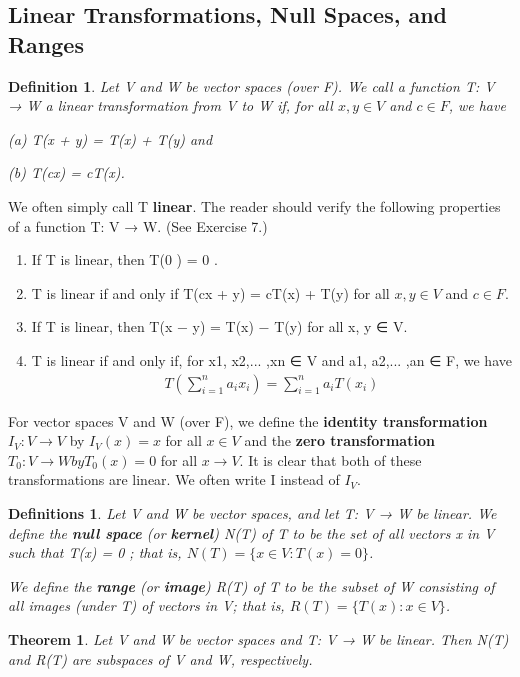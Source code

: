 \documentclass{article}
\newcommand{\bd}[1]{\textbf{#1}}
\theoremstyle{plain}
\newtheorem{theorem}{Theorem}[section]
\newtheorem*{definition1}{Definition}
\newtheorem*{definitions}{Definitions}
\theoremstyle{plain} %
\begin{document}
\subsection{Linear Transformations, Null Spaces, and Ranges}

\begin{definition1}
Let V and W be vector spaces (over F). We call a function T: V → W a linear transformation from V to W if, for all $x, y \in V$ and $c \in F$, we have

(a) T(x + y) = T(x) + T(y) and

(b) T(cx) = cT(x).
\end{definition1}

We often simply call T \bd{linear}. The reader should verify the following
properties of a function T: V → W. (See Exercise 7.)
\begin{enumerate}
\item If T is linear, then T(0 ) = 0 .
\item T is linear if and only if T(cx + y) = cT(x) + T(y) for all $x, y \in V$ and
$c \in F$.
\item If T is linear, then T(x − y) = T(x) − T(y) for all x, y ∈ V.
\item T is linear if and only if, for x1, x2,... ,xn ∈ V and a1, a2,... ,an ∈ F, we have 
\begin{align*}
T\left(\sum_{i=1}^n a_ix_i\right)=\sum_{i=1}^n a_iT(x_i)
\end{align*}
\end{enumerate}

For vector spaces V and W (over F), we define the \bd{identity transformation} $I_V : V \to V$ by $I_V(x) = x$ for all $x \in V$ and the \bd{zero transformation} $T_0 : V \to W by T_0(x) = 0$ for all $x \to V$. It is clear that both of these transformations are linear. We often write I instead of $I_V$.

\begin{definitions}
Let V and W be vector spaces, and let T: V → W be linear.
We define the \bd{null space} (or \bd{kernel}) N(T) of T to be the set of all vectors x in V such that T(x) = 0 ; that is, $N(T) = \{x \in V: T(x) = 0 \}$.

We define the \bd{range} (or \bd{image}) R(T) of T to be the subset of W consisting of all images (under T) of vectors in V; that is, $R(T) = \{T(x): x \in V\}$.
\end{definitions}

\begin{theorem}
Let V and W be vector spaces and T: V → W be linear. Then N(T) and R(T) are subspaces of V and W, respectively.
\end{theorem}
\end{document}
